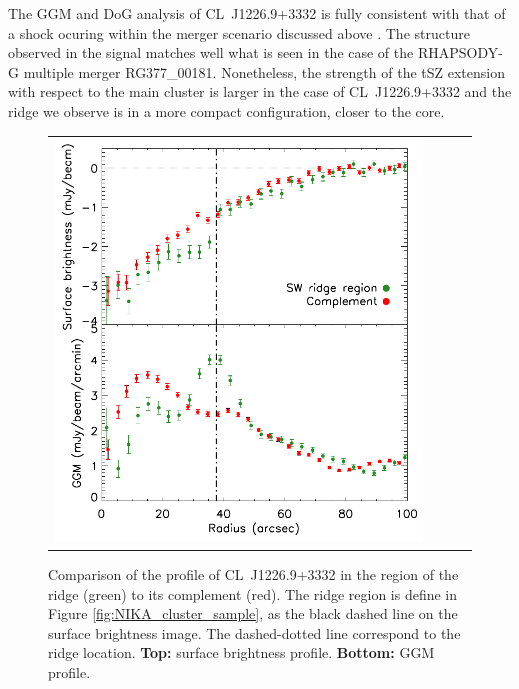 \documentclass[twocolumn,traditabstract]{aa}
\begin{document}
The GGM and DoG analysis of \mbox{CL~J1226.9+3332} is fully consistent with that of a shock ocuring within the merger scenario discussed above \citep[see also][for more details]{Adam2015}. The structure observed in the signal matches well what is seen in the case of the RHAPSODY-G multiple merger RG377\_00181. Nonetheless, the strength of the tSZ extension with respect to the main cluster is larger in the case of \mbox{CL~J1226.9+3332} and the ridge we observe is in a more compact configuration, closer to the core.

\begin{figure}[h]
\resizebox{0.5\textwidth}{!} {
\begin{tabular}{llll}
\includegraphics[trim=0cm 0cm 0cm 0cm, clip=true, scale=1]{Figure/profile_CLJ1227.pdf} 
\end{tabular}}
\caption{\footnotesize{Comparison of the profile of \mbox{CL~J1226.9+3332} in the region of the ridge (green) to its complement (red). The ridge region is define in Figure \ref{fig:NIKA_cluster_sample}, as the black dashed line on the surface brightness image. The dashed-dotted line correspond to the ridge location. {\bf Top:} surface brightness profile. {\bf Bottom:} GGM profile.}}
\label{fig:profile_CLJ1227}
\end{figure}
\end{document}
